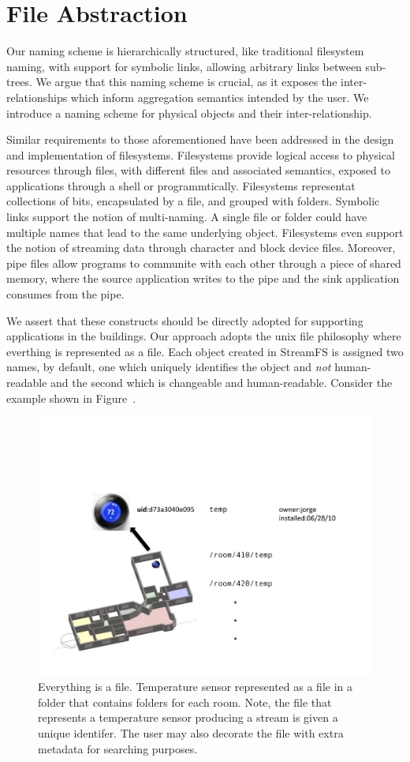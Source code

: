 \section{File Abstraction}

Our naming scheme is hierarchically structured, like traditional filesystem naming, with support
for symbolic links, allowing arbitrary links between sub-trees.  We argue that this naming scheme
is crucial, as it exposes the inter-relationships which inform aggregation semantics intended
by the user.  We introduce a naming scheme for physical objects and their inter-relationship.




Similar requirements to those aforementioned have been addressed in the design and implementation of filesystems.  Filesystems provide
logical access to physical resources through files, with different files and associated semantics, exposed to applications through a shell
or programmtically.  Filesystems representat collections of bits, encapsulated by a file, and grouped with folders.  Symbolic links support
the notion of multi-naming.  A single file or folder could have multiple names that lead to the same underlying object.  Filesystems even
support the notion of streaming data through character and block device files.  Moreover, pipe files allow programs to communite with each
other through a piece of shared memory, where the source application writes to the pipe and the sink application consumes from the pipe.

We assert that these constructs should be directly adopted for supporting applications in the buildings.  Our approach adopts the unix
file philosophy where everthing is represented as a file.  Each object created in StreamFS is assigned two names, by default, one which 
uniquely identifies the object and \emph{not} human-readable and the second which is changeable and human-readable.  Consider
the example shown in Figure~\cite{fig:everythingfile}.


\begin{figure}[t!] %
\centering
\includegraphics[width=0.65\columnwidth]{figs/everythingfile}
\caption{Everything is a file.  Temperature sensor represented as a file in a folder that contains folders for each room.
Note, the file that represents a temperature sensor producing a stream is given a unique identifer.  The user may also
decorate the file with extra metadata for searching purposes.}
\label{fig:everythingfile}
\end{figure}

